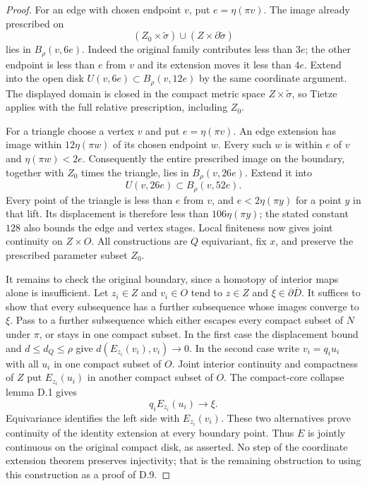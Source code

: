 \begin{proof}
For an edge with chosen endpoint $v$, put $e=\eta(\pi v)$.
The image already prescribed on
\[
 (Z_0\times\widetilde\sigma)
       \cup(Z\times\partial\widetilde\sigma)
\]
lies in $B_\rho(v,6e)$.  Indeed the original family contributes
less than $3e$; the other endpoint is less than $e$ from $v$
and its extension moves it less than $4e$.
Extend into the open disk
$U(v,6e)\subset B_\rho(v,12e)$ by the same coordinate argument.
The displayed domain is closed in the compact metric space
$Z\times\widetilde\sigma$, so Tietze applies with the full
relative prescription, including $Z_0$.

For a triangle choose a vertex $v$ and put $e=\eta(\pi v)$.
An edge extension has image within $12\eta(\pi w)$ of its
chosen endpoint $w$.  Every such $w$ is within $e$ of $v$ and
$\eta(\pi w)<2e$.  Consequently the entire prescribed image
on the boundary, together with $Z_0$ times the triangle, lies
in $B_\rho(v,26e)$.  Extend it into
\[
 U(v,26e)\subset B_\rho(v,52e).
\]
Every point of the triangle is less than $e$ from $v$, and
$e<2\eta(\pi y)$ for a point $y$ in that lift.  Its displacement
is therefore less than $106\eta(\pi y)$; the stated constant
$128$ also bounds the edge and vertex stages.  Local finiteness
now gives joint continuity on $Z\times O$.  All constructions
are $Q$ equivariant, fix $x$, and preserve the prescribed
parameter subset $Z_0$.

It remains to check the original boundary, since a homotopy of
interior maps alone is insufficient.  Let $z_i\in Z$ and
$v_i\in O$ tend to $z\in Z$ and $\xi\in\partial\overline D$.
It suffices to show that every subsequence has a further
subsequence whose images converge to $\xi$.  Pass to a further
subsequence which either escapes every compact subset of $N$
under $\pi$, or stays in one compact subset.  In the first case the displacement
bound and $d\leq d_Q\leq\rho$ give
$d(E_{z_i}(v_i),v_i)\to0$.
In the second case write
$v_i=q_i u_i$ with all $u_i$ in one compact subset of $O$.
Joint interior continuity and compactness of $Z$ put
$E_{z_i}(u_i)$ in another compact subset of $O$.
The compact-core collapse lemma D.1 gives
\[
 q_iE_{z_i}(u_i)\longrightarrow\xi.
\]
Equivariance identifies the left side with $E_{z_i}(v_i)$.
These two alternatives prove continuity of the identity
extension at every boundary point.  Thus $E$ is jointly
continuous on the original compact disk, as asserted.
No step of the coordinate extension theorem preserves
injectivity; that is the remaining obstruction to using this
construction as a proof of D.9.
\end{proof}
